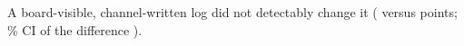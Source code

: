 A board-visible, channel-written log did not detectably change it (\wtthHaikuHTwoDeltaRZero{} versus \wtthHaikuHTwoDeltaROne{} points; \wtthProtocolLevel\% CI of the difference \wtthHaikuHTwoCI).

